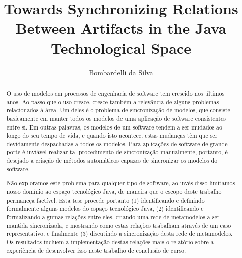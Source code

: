 \documentclass[cic,resumo-unibral]{iiufrgs}
\title{Towards Synchronizing Relations Between Artifacts in the Java Technological Space}
\author{Bombardelli da Silva}{William}
\begin{document}
\maketitle




\begin{abstract}
O uso de modelos em processos de engenharia de software tem crescido nos últimos anos. Ao passo que o uso cresce, cresce também a relevância de alguns problemas relacionados à área. Um deles é o problema de sincronização de modelos, que consiste basicamente em manter todos os modelos de uma aplicação de software consistentes entre si. Em outras palavras, os modelos de um software tendem a ser mudados ao longo do seu tempo de vida, e quando isto acontece, estas mudanças têm que ser devidamente despachadas a todos os modelos. Para aplicações de software de grande porte é inviável realizar tal procedimento de sincronização manualmente, portanto, é desejado a criação de métodos automáticos capazes de sincronizar os modelos do software.

Não exploramos este problema para qualquer tipo de software, ao invés disso limitamos nosso domínio ao espaço tecnológico Java, de maneira que o escopo deste trabalho permaneça factível. Esta tese procede portanto (1) identificando e definindo formalmente alguns modelos do espaço tecnológico Java, (2) identificando e formalizando algumas relações entre eles, criando uma rede de metamodelos a ser mantida sincronizada, e mostrando como estas relações trabalham através de um caso representativo, e finalmente (3) discutindo a sincronização desta rede de metamodelos. Os resultados incluem a implementação destas relações mais o relatório sobre a experiência de desenvolver isso neste trabalho de conclusão de curso.
\end{abstract}
\end{document}
